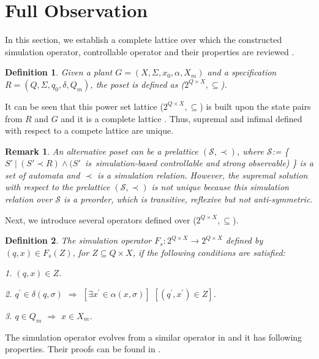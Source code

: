 \documentclass[12pt,draftcls,onecolumn]{IEEEtran}
\newtheorem{Remark}{Remark}
\newtheorem{Definition}{Definition}
\begin{document}
\section{Full Observation}
In this section, we establish a complete lattice over which the
constructed simulation operator, controllable operator and their
properties are reviewed \cite{sun}.



\begin{Definition} Given a plant $G =(X,\Sigma,x_{0},\alpha,X_{m})$ and
a specification $R =(Q,\Sigma,q_{0},\delta,Q_{m})$, the poset is
defined as ($2^{Q \times X}, \subseteq$).
\end{Definition}

It can be seen that this power set lattice ($2^{Q \times X},
\subseteq$) is built upon the state pairs from $R$ and $G$ and it
is a complete lattice \cite{kb}. Thus, supremal and infimal
defined with respect to a compete lattice are unique.

\begin{Remark}
An alternative poset can be a prelattice $(\mathcal{S}, \prec)$,
where $\mathcal{S}$:= \{$S' ~|~ (S' \prec R) \wedge
(S'$~is~simulation-based controllable and strong observable) \} is
a set of automata and $\prec$ is a simulation relation. However,
the supremal solution with respect to the prelattice
$(\mathcal{S}, \prec)$ is not unique because this simulation
relation over $\mathcal{S}$ is a preorder, which is transitive,
reflexive but not anti-symmetric.






\end{Remark}

Next, we introduce several operators defined over ($2^{Q \times
X}, \subseteq$).



\begin{Definition}
The simulation operator $F_s: 2^{Q \times X} \rightarrow 2^{Q \times X}$ defined by
$(q, x) \in F_s(Z)$, for $ Z \subseteq Q \times X$, if the following
conditions are satisfied:

1. $(q, x) \in Z$.

2. $ q^{'} \in \delta(q, \sigma)$ $\Rightarrow$ $[\exists x^{'}
\in \alpha(x, \sigma)]$ $[(q^{'}, x^{'}) \in Z]$.

3. $q \in Q_{m} $ $\Rightarrow$ $x \in X_{m} $.
\end{Definition}

The simulation operator evolves from a similar operator in
\cite{pov} and it has following properties. Their proofs can be
found in \cite{sun}.
\end{document}
